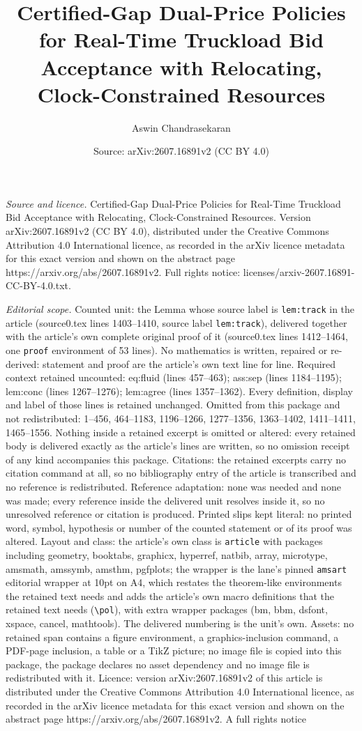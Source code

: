 \documentclass[10pt,a4paper]{amsart}
\title[Certified-Gap Dual-Price Policies for Real-Time Truckload Bi]{Certified-Gap Dual-Price Policies for Real-Time Truckload Bid Acceptance with Relocating, Clock-Constrained Resources}
\author{Aswin Chandrasekaran}
\date{Source: arXiv:2607.16891v2 (CC BY 4.0)}
\begin{document}
\maketitle

\noindent\emph{Source and licence.} Certified-Gap Dual-Price Policies for Real-Time Truckload Bid Acceptance with Relocating, Clock-Constrained Resources. Version arXiv:2607.16891v2 (CC BY 4.0), distributed under the Creative Commons Attribution 4.0 International licence, as recorded in the arXiv licence metadata for this exact version and shown on the abstract page https://arxiv.org/abs/2607.16891v2. Full rights notice: licenses/arxiv-2607.16891-CC-BY-4.0.txt.\par\smallskip

\noindent\textit{Editorial scope.} Counted unit: the Lemma whose source label is \texttt{lem:track} in the article (source0.tex lines 1403--1410, source label \texttt{lem:track}), delivered together with the article's own complete original proof of it (source0.tex lines 1412--1464, one \texttt{proof} environment of 53 lines). No mathematics is written, repaired or re-derived: statement and proof are the article's own text line for line. Required context retained uncounted: eq:fluid (lines 457--463); ass:sep (lines 1184--1195); lem:conc (lines 1267--1276); lem:agree (lines 1357--1362). Every definition, display and label of those lines is retained unchanged. Omitted from this package and not redistributed: 1--456, 464--1183, 1196--1266, 1277--1356, 1363--1402, 1411--1411, 1465--1556. Nothing inside a retained excerpt is omitted or altered: every retained body is delivered exactly as the article's lines are written, so no omission receipt of any kind accompanies this package. Citations: the retained excerpts carry no citation command at all, so no bibliography entry of the article is transcribed and no reference is redistributed. Reference adaptation: none was needed and none was made; every reference inside the delivered unit resolves inside it, so no unresolved reference or citation is produced. Printed slips kept literal: no printed word, symbol, hypothesis or number of the counted statement or of its proof was altered. Layout and class: the article's own class is \texttt{article} with packages including geometry, booktabs, graphicx, hyperref, natbib, array, microtype, amsmath, amssymb, amsthm, pgfplots; the wrapper is the lane's pinned \texttt{amsart} editorial wrapper at 10pt on A4, which restates the theorem-like environments the retained text needs and adds the article's own macro definitions that the retained text needs (\texttt{\textbackslash pol}), with extra wrapper packages (bm, bbm, dsfont, xspace, cancel, mathtools). The delivered numbering is the unit's own. Assets: no retained span contains a figure environment, a graphics-inclusion command, a PDF-page inclusion, a table or a TikZ picture; no image file is copied into this package, the package declares no asset dependency and no image file is redistributed with it. Licence: version arXiv:2607.16891v2 of this article is distributed under the Creative Commons Attribution 4.0 International licence, as recorded in the arXiv licence metadata for this exact version and shown on the abstract page https://arxiv.org/abs/2607.16891v2. A full rights notice 
\end{document}
